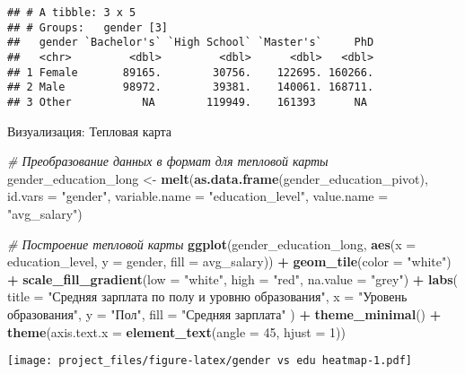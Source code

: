 \documentclass[
]{article}
\newenvironment{Shaded}{\begin{snugshade}}{\end{snugshade}}
\newcommand{\AttributeTok}[1]{\textcolor[rgb]{0.13,0.29,0.53}{#1}}
\newcommand{\CommentTok}[1]{\textcolor[rgb]{0.56,0.35,0.01}{\textit{#1}}}
\newcommand{\DecValTok}[1]{\textcolor[rgb]{0.00,0.00,0.81}{#1}}
\newcommand{\FunctionTok}[1]{\textcolor[rgb]{0.13,0.29,0.53}{\textbf{#1}}}
\newcommand{\NormalTok}[1]{#1}
\newcommand{\OtherTok}[1]{\textcolor[rgb]{0.56,0.35,0.01}{#1}}
\newcommand{\SpecialCharTok}[1]{\textcolor[rgb]{0.81,0.36,0.00}{\textbf{#1}}}
\newcommand{\StringTok}[1]{\textcolor[rgb]{0.31,0.60,0.02}{#1}}
\begin{document}
\begin{verbatim}
## # A tibble: 3 x 5
## # Groups:   gender [3]
##   gender `Bachelor's` `High School` `Master's`     PhD
##   <chr>         <dbl>         <dbl>      <dbl>   <dbl>
## 1 Female       89165.        30756.    122695. 160266.
## 2 Male         98972.        39381.    140061. 168711.
## 3 Other           NA        119949.    161393      NA
\end{verbatim}

Визуализация: Тепловая карта

\begin{Shaded}
\begin{Highlighting}[]
\CommentTok{\# Преобразование данных в формат для тепловой карты}
\NormalTok{gender\_education\_long }\OtherTok{\textless{}{-}} \FunctionTok{melt}\NormalTok{(}\FunctionTok{as.data.frame}\NormalTok{(gender\_education\_pivot), }\AttributeTok{id.vars =} \StringTok{"gender"}\NormalTok{, }\AttributeTok{variable.name =} \StringTok{"education\_level"}\NormalTok{, }\AttributeTok{value.name =} \StringTok{"avg\_salary"}\NormalTok{)}

\CommentTok{\# Построение тепловой карты}
\FunctionTok{ggplot}\NormalTok{(gender\_education\_long, }\FunctionTok{aes}\NormalTok{(}\AttributeTok{x =}\NormalTok{ education\_level, }\AttributeTok{y =}\NormalTok{ gender, }\AttributeTok{fill =}\NormalTok{ avg\_salary)) }\SpecialCharTok{+}
  \FunctionTok{geom\_tile}\NormalTok{(}\AttributeTok{color =} \StringTok{"white"}\NormalTok{) }\SpecialCharTok{+}
  \FunctionTok{scale\_fill\_gradient}\NormalTok{(}\AttributeTok{low =} \StringTok{"white"}\NormalTok{, }\AttributeTok{high =} \StringTok{"red"}\NormalTok{, }\AttributeTok{na.value =} \StringTok{"grey"}\NormalTok{) }\SpecialCharTok{+}
  \FunctionTok{labs}\NormalTok{(}
    \AttributeTok{title =} \StringTok{"Средняя зарплата по полу и уровню образования"}\NormalTok{,}
    \AttributeTok{x =} \StringTok{"Уровень образования"}\NormalTok{,}
    \AttributeTok{y =} \StringTok{"Пол"}\NormalTok{,}
    \AttributeTok{fill =} \StringTok{"Средняя зарплата"}
\NormalTok{  ) }\SpecialCharTok{+}
  \FunctionTok{theme\_minimal}\NormalTok{() }\SpecialCharTok{+}
  \FunctionTok{theme}\NormalTok{(}\AttributeTok{axis.text.x =} \FunctionTok{element\_text}\NormalTok{(}\AttributeTok{angle =} \DecValTok{45}\NormalTok{, }\AttributeTok{hjust =} \DecValTok{1}\NormalTok{))}
\end{Highlighting}
\end{Shaded}

\texttt{[image: project\_files/figure-latex/gender vs edu heatmap-1.pdf]}
\end{document}
